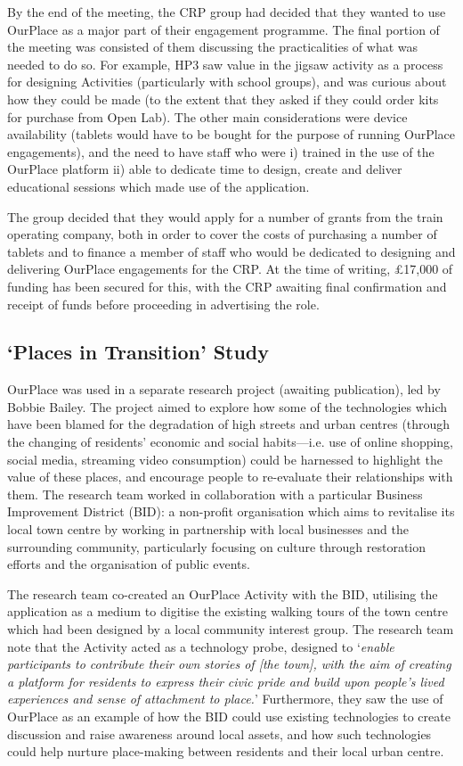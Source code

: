 By the end of the meeting, the CRP group had decided that they wanted to use OurPlace as a major part of their engagement programme. The final portion of the meeting was consisted of them discussing the practicalities of what was needed to do so. For example, HP3 saw value in the jigsaw activity as a process for designing Activities (particularly with school groups), and was curious about how they could be made (to the extent that they asked if they could order kits for purchase from Open Lab). The other main considerations were device availability (tablets would have to be bought for the purpose of running OurPlace engagements), and the need to have staff who were i) trained in the use of the OurPlace platform ii) able to dedicate time to design, create and deliver educational sessions which made use of the application.

The group decided that they would apply for a number of grants from the train operating company, both in order to cover the costs of purchasing a number of tablets and to finance a member of staff who would be dedicated to designing and delivering OurPlace engagements for the CRP. At the time of writing, £17,000 of funding has been secured for this, with the CRP awaiting final confirmation and receipt of funds before proceeding in advertising the role.

\subsection{`Places in Transition' Study}

OurPlace was used in a separate research project (awaiting publication), led by Bobbie Bailey. The project aimed to explore how some of the technologies which have been blamed for the degradation of high streets and urban centres (through the changing of residents' economic and social habits---i.e. use of online shopping, social media, streaming video consumption) could be harnessed to highlight the value of these places, and encourage people to re-evaluate their relationships with them. The research team worked in collaboration with a particular Business Improvement District (BID): a non-profit organisation which aims to revitalise its local town centre by working in partnership with local businesses and the surrounding community, particularly focusing on culture through restoration efforts and the organisation of public events.

The research team co-created an OurPlace Activity with the BID, utilising the application as a medium to digitise the existing walking tours of the town centre which had been designed by a local community interest group. The research team note that the Activity acted as a technology probe, designed to `\textit{enable participants to contribute their own stories of [the town], with the aim of creating a platform for residents to express their civic pride and build upon people’s lived experiences and sense of attachment to place.}' Furthermore, they saw the use of OurPlace as an example of how the BID could use existing technologies to create discussion and raise awareness around local assets, and how such technologies could help nurture place-making between residents and their local urban centre.

